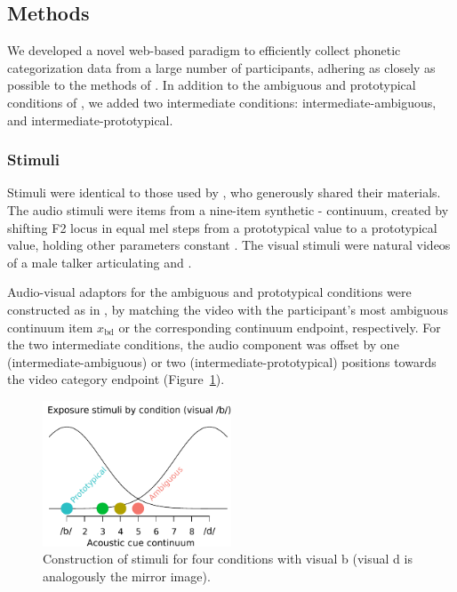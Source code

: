 \subsection{Methods}
\label{sec:methods-4}

We developed a novel web-based paradigm to efficiently collect phonetic categorization data from a large number of participants, adhering as closely as possible to the methods of \textcite{Vroomen2007}.  In addition to the ambiguous and prototypical conditions of \textcite{Vroomen2007}, we added two intermediate conditions: intermediate-ambiguous, and intermediate-prototypical.

\subsubsection{Stimuli}
\label{sec:stimuli}

Stimuli were identical to those used by \textcite{Vroomen2007}, who generously shared their materials.  The audio stimuli were items from a nine-item synthetic - continuum, created by shifting F2 locus in equal mel steps from a prototypical  value to a prototypical  value, holding other parameters constant \autocite{Vroomen2004}.  The visual stimuli were natural videos of a male talker articulating  and .

Audio-visual adaptors for the ambiguous and prototypical conditions were constructed as in \textcite{Vroomen2007}, by matching the video with the participant's most ambiguous continuum item $x_\mathrm{bd}$ or the corresponding continuum endpoint, respectively.  For the two intermediate conditions, the audio component was offset by one (intermediate-ambiguous) or two (intermediate-prototypical) positions towards the video category endpoint (Figure~\ref{fig:conditions-schematic}).

\begin{figure}[htb]
  \centering
  \includegraphics[width=0.5\textwidth]{figs/schematic-conditions-modified.pdf}
  \caption{Construction of stimuli for four conditions with visual \ph b (visual \ph d is analogously the mirror image).}
  \label{fig:conditions-schematic}
\end{figure}

